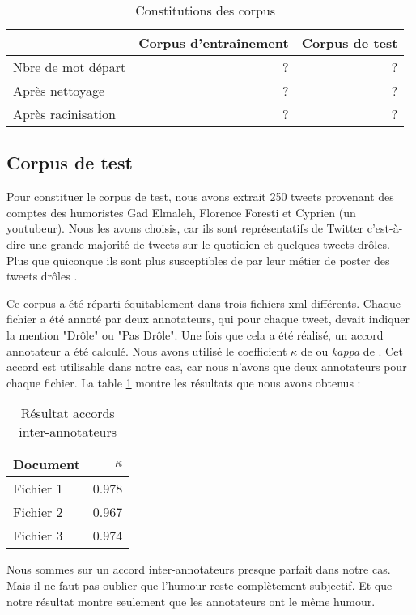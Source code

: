 \documentclass[10pt,a4paper,twoside]{article}
\begin{document}
\begin{table}[!h]
\centering
	\begin{tabular}{lrr}
	\toprule
	& Corpus d'entraînement & Corpus de test \\
	\midrule
	 Nbre de mot départ & ? & ? \\
	 Après nettoyage & ? & ? \\
	 Après racinisation & ? & ? \\
	\bottomrule
	\end{tabular}
\caption{Constitutions des corpus}
\end{table}

\subsection{Corpus de test} 
Pour constituer le corpus de test, nous avons extrait 250 tweets provenant des comptes des humoristes Gad Elmaleh, Florence Foresti et Cyprien (un youtubeur). Nous les avons choisis, car ils sont représentatifs de Twitter c'est-à-dire une grande majorité de tweets sur le quotidien et quelques tweets drôles. Plus que quiconque ils sont plus susceptibles de par leur métier de poster des tweets drôles .

Ce corpus a été réparti équitablement dans trois fichiers xml différents. Chaque fichier a été annoté par deux annotateurs, qui pour chaque tweet, devait indiquer la mention "Drôle" ou "Pas Drôle". Une fois que cela a été réalisé, un accord annotateur a été calculé. Nous avons utilisé le coefficient $\kappa$ de \cite{cohen1960} ou \textit{kappa} de \cite{Carletta}. Cet accord est utilisable dans notre cas, car nous n'avons que deux annotateurs pour chaque fichier. La table \ref{anno} montre les résultats que nous avons obtenus :

\begin{table}[!h]
\centering
	\begin{tabular}{lr}
	\toprule
	 Document & $\kappa$ \\
	\midrule
	  Fichier 1 & 0.978 \\
	  Fichier 2 &  0.967\\
	  Fichier 3 & 0.974  \\
	\bottomrule
	\end{tabular}
\caption{Résultat accords inter-annotateurs}
\label{anno}
\end{table}

Nous sommes sur un accord inter-annotateurs presque parfait dans notre cas. Mais il ne faut pas oublier que l'humour reste complètement subjectif. Et que notre résultat montre seulement que les annotateurs ont le même humour.
\end{document}

